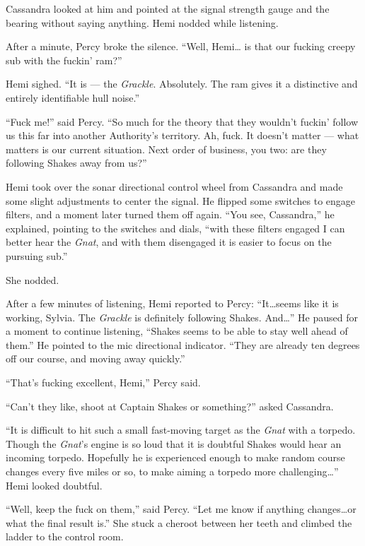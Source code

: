 \documentclass[
]{scrbook}
\begin{document}
Cassandra looked at him and pointed at the signal strength gauge and the
bearing without saying anything. Hemi nodded while listening.

After a minute, Percy broke the silence. ``Well, Hemi\ldots{} is that
our fucking creepy sub with the fuckin' ram?''

Hemi sighed. ``It is --- the \emph{Grackle}. Absolutely. The ram gives
it a distinctive and entirely identifiable hull noise.''

``Fuck me!'' said Percy. ``So much for the theory that they wouldn't
fuckin' follow us this far into another Authority's territory. Ah, fuck.
It doesn't matter --- what matters is our current situation. Next order
of business, you two: are they following Shakes away from us?''

Hemi took over the sonar directional control wheel from Cassandra and
made some slight adjustments to center the signal. He flipped some
switches to engage filters, and a moment later turned them off again.
``You see, Cassandra,'' he explained, pointing to the switches and
dials, ``with these filters engaged I can better hear the \emph{Gnat},
and with them disengaged it is easier to focus on the pursuing sub.''

She nodded.

After a few minutes of listening, Hemi reported to Percy:
``It\ldots seems like it is working, Sylvia. The \emph{Grackle} is
definitely following Shakes. And\ldots{}'' He paused for a moment to
continue listening, ``Shakes seems to be able to stay well ahead of
them.'' He pointed to the mic directional indicator. ``They are already
ten degrees off our course, and moving away quickly.''

``That's fucking excellent, Hemi,'' Percy said.

``Can't they like, shoot at Captain Shakes or something?'' asked
Cassandra.

``It is difficult to hit such a small fast-moving target as the
\emph{Gnat} with a torpedo. Though the \emph{Gnat}'s engine is so loud
that it is doubtful Shakes would hear an incoming torpedo. Hopefully he
is experienced enough to make random course changes every five miles or
so, to make aiming a torpedo more challenging\ldots{}'' Hemi looked
doubtful.

``Well, keep the fuck on them,'' said Percy. ``Let me know if anything
changes\ldots or what the final result is.'' She stuck a cheroot between
her teeth and climbed the ladder to the control room.
\end{document}
